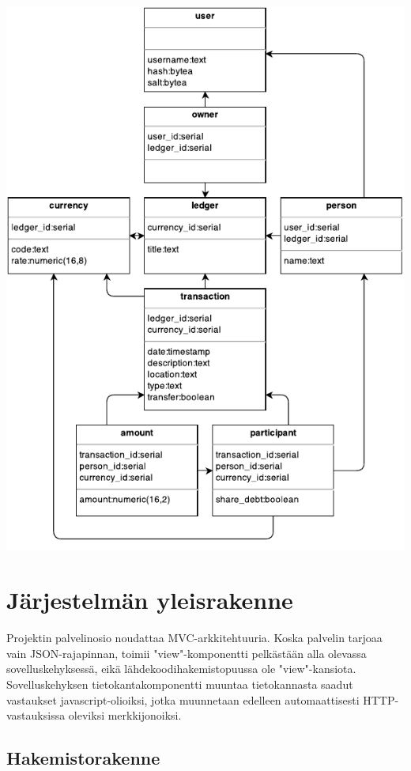 \documentclass[a4paper,parskip=half]{scrartcl}
\begin{document}
\includegraphics[scale=1.35]{schema}

\section{Järjestelmän yleisrakenne}

Projektin palvelinosio noudattaa MVC-arkkitehtuuria. Koska palvelin tarjoaa
vain JSON-rajapinnan, toimii "view"-komponentti pelkästään alla olevassa
sovelluskehyksessä, eikä lähdekoodihakemistopuussa ole "view"-kansiota.
Sovelluskehyksen tietokantakomponentti muuntaa tietokannasta saadut vastaukset
javascript-olioiksi, jotka muunnetaan edelleen automaattisesti
HTTP-vastauksissa oleviksi merkkijonoiksi.

\subsection{Hakemistorakenne}
\end{document}
